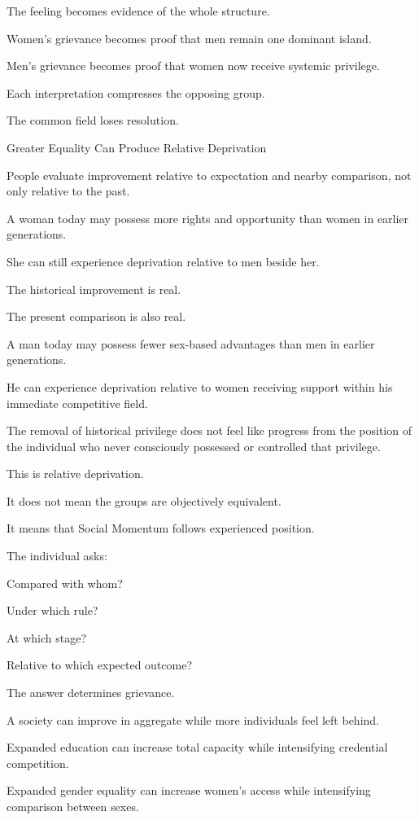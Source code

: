The feeling becomes evidence of the whole structure.

Women’s grievance becomes proof that men remain one dominant island.

Men’s grievance becomes proof that women now receive systemic privilege.

Each interpretation compresses the opposing group.

The common field loses resolution.

Greater Equality Can Produce Relative Deprivation

People evaluate improvement relative to expectation and nearby comparison, not only relative to the past.

A woman today may possess more rights and opportunity than women in earlier generations.

She can still experience deprivation relative to men beside her.

The historical improvement is real.

The present comparison is also real.

A man today may possess fewer sex-based advantages than men in earlier generations.

He can experience deprivation relative to women receiving support within his immediate competitive field.

The removal of historical privilege does not feel like progress from the position of the individual who never consciously possessed or controlled that privilege.

This is relative deprivation.

It does not mean the groups are objectively equivalent.

It means that Social Momentum follows experienced position.

The individual asks:

Compared with whom?

Under which rule?

At which stage?

Relative to which expected outcome?

The answer determines grievance.

A society can improve in aggregate while more individuals feel left behind.

Expanded education can increase total capacity while intensifying credential competition.

Expanded gender equality can increase women’s access while intensifying comparison between sexes.

